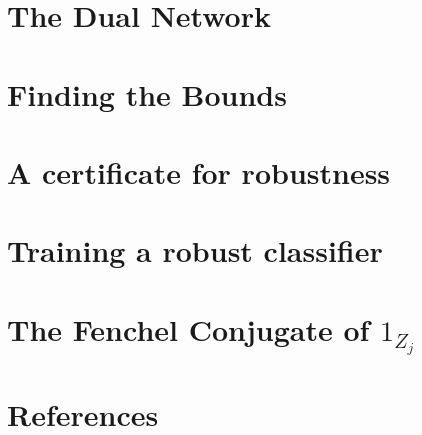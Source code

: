 \documentclass{amsart}
\begin{document}
\pagebreak

\section{The Dual Network}



\pagebreak

\section{Finding the Bounds}



\pagebreak

\section{A certificate for robustness}



\pagebreak

\section{Training a robust classifier}



\pagebreak

\section{The Fenchel Conjugate of \texorpdfstring{$1_{Z_j}$}{1\_Z\_j}}



\pagebreak

\section{References}



\pagebreak

\printbibliography
\end{document}
